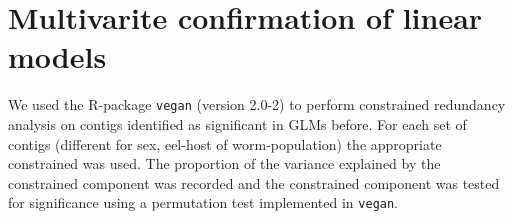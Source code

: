 \section{Multivarite confirmation of linear models}
\label{sec:mult-conf-line}

We used the R-package \texttt{vegan} (version 2.0-2) to perform
constrained redundancy analysis on contigs identified as significant
in GLMs before. For each set of contigs (different for sex, eel-host
of worm-population) the appropriate constrained was used. The
proportion of the variance explained by the constrained component was
recorded and the constrained component was tested for significance
using a permutation test implemented in \texttt{vegan}.






 






